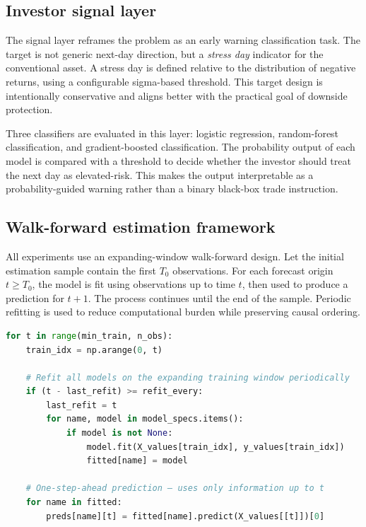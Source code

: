 \subsection{Investor signal layer}

The signal layer reframes the problem as an early warning classification task. The target is not generic next-day direction, but a \emph{stress day} indicator for the conventional asset. A stress day is defined relative to the distribution of negative returns, using a configurable sigma-based threshold. This target design is intentionally conservative and aligns better with the practical goal of downside protection.

Three classifiers are evaluated in this layer: logistic regression, random-forest classification, and gradient-boosted classification. The probability output of each model is compared with a threshold to decide whether the investor should treat the next day as elevated-risk. This makes the output interpretable as a probability-guided warning rather than a binary black-box trade instruction.

\subsection{Walk-forward estimation framework}

All experiments use an expanding-window walk-forward design. Let the initial estimation sample contain the first $T_0$ observations. For each forecast origin $t \geq T_0$, the model is fit using observations up to time $t$, then used to produce a prediction for $t+1$. The process continues until the end of the sample. Periodic refitting is used to reduce computational burden while preserving causal ordering.

\begin{lstlisting}[language=Python, caption={Expanding-window walk-forward loop (\texttt{pipeline.py}).}, label=lst:walkforward]
for t in range(min_train, n_obs):
    train_idx = np.arange(0, t)

    # Refit all models on the expanding training window periodically
    if (t - last_refit) >= refit_every:
        last_refit = t
        for name, model in model_specs.items():
            if model is not None:
                model.fit(X_values[train_idx], y_values[train_idx])
                fitted[name] = model

    # One-step-ahead prediction — uses only information up to t
    for name in fitted:
        preds[name][t] = fitted[name].predict(X_values[[t]])[0]
\end{lstlisting}

